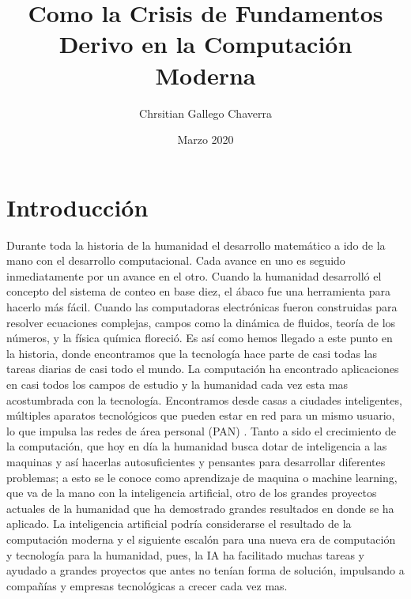 \documentclass{article}
\title{Como la Crisis de Fundamentos Derivo en la Computación Moderna}
\author{Chrsitian Gallego Chaverra}
\date{Marzo 2020}
\begin{document}
\maketitle

\section{Introducción}
Durante toda la historia de la humanidad el desarrollo matemático a ido de la mano con el desarrollo computacional. Cada avance en uno es seguido inmediatamente por un avance en el otro. Cuando la humanidad desarrolló el concepto del sistema de conteo en base diez, el ábaco fue una herramienta para hacerlo más fácil. Cuando las computadoras electrónicas fueron construidas para resolver ecuaciones complejas, campos como la dinámica de fluidos, teoría de los números, y la física química floreció.
Es así como hemos llegado a este punto en la historia, donde encontramos que la tecnología hace parte de casi todas las tareas diarias de casi todo el mundo. La computación ha encontrado aplicaciones en casi todos los campos de estudio y la humanidad cada vez esta mas acostumbrada con la tecnología. Encontramos desde casas a ciudades inteligentes, múltiples aparatos tecnológicos que pueden estar en red para un mismo usuario, lo que impulsa las redes de área personal (PAN) \citep{pan}.
Tanto a sido el crecimiento de la computación, que hoy en día la humanidad busca dotar de inteligencia a las maquinas y así hacerlas autosuficientes y pensantes para desarrollar diferentes problemas; a esto se le conoce como aprendizaje de maquina o machine learning, que va de la mano con la inteligencia artificial, otro de los grandes proyectos actuales de la humanidad que ha demostrado grandes resultados en donde se ha aplicado. La inteligencia artificial podría considerarse el resultado de la computación moderna y el siguiente escalón para una nueva era de computación y tecnología para la humanidad, pues, la IA ha facilitado muchas tareas y ayudado a grandes proyectos que antes no tenían forma de solución, impulsando a compañías y empresas tecnológicas a crecer cada vez mas. \citep{ia}
  
\end{document}
